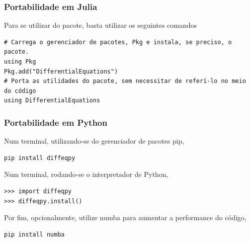 \documentclass[
12pt,				%
openright,			%
oneside,			%
a4paper,			%
english,			%
french,				%
spanish,			%
brazil,				%
]{abntex2}
\begin{document}

\subsubsection{Portabilidade em Julia}

Para se utilizar do pacote, basta utilizar os seguintes comandos

\begin{verbatim}
# Carrega o gerenciador de pacotes, Pkg e instala, se preciso, o pacote.
using Pkg
Pkg.add("DifferentialEquations")
# Porta as utilidades do pacote, sem necessitar de referí-lo no meio do código
using DifferentialEquations
\end{verbatim}

\subsubsection{Portabilidade em Python}

Num terminal, utilizando-se do gerenciador de pacotes pip,
\begin{verbatim}
pip install diffeqpy
\end{verbatim}

Num terminal, rodando-se o interpretador de Python,
\begin{verbatim}
>>> import diffeqpy
>>> diffeqpy.install()
\end{verbatim}

Por fim, opcionalmente, utilize numba para aumentar a performance do código,
\begin{verbatim}
pip install numba
\end{verbatim}
\end{document}
